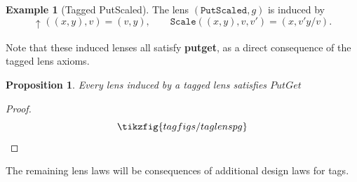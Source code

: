 \documentclass[a4paper,11pt]{article}
\newcommand{\putt}[1]{\mathbin{\uparrow_{#1}}}
\theoremstyle{definition}
\theoremstyle{plain}
\newtheorem{prop}{Proposition}
\theoremstyle{plain}
\theoremstyle{definition}
\newtheorem{example}{Example}
\begin{document}
\begin{example}[Tagged PutScaled]
The lens $(\texttt{PutScaled},g)$ is induced by
\[
\putt{}((x,y),v)=(v,y),
\qquad
\texttt{Scale}((x,y),v,v')=(x,v'y/v).
\]
\end{example}
Note that these induced lenses all satisfy \textbf{putget}, as a direct consequence of the tagged lens axioms.
\begin{prop}
Every lens induced by a tagged lens satisfies $PutGet$
\end{prop}
\begin{proof}
\[\tikzfig{tagfigs/taglenspg}\]
\end{proof}
The remaining lens laws will be consequences of additional design laws for tags.
\end{document}

